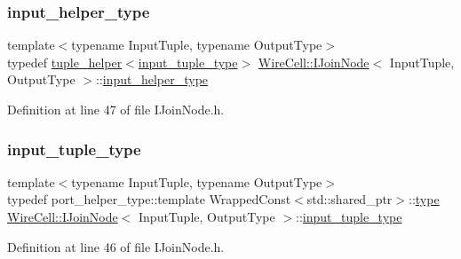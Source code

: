 \subsubsection{\texorpdfstring{input\+\_\+helper\+\_\+type}{input\_helper\_type}}
{\footnotesize\ttfamily template$<$typename Input\+Tuple, typename Output\+Type$>$ \\
typedef \hyperlink{struct_wire_cell_1_1tuple__helper}{tuple\+\_\+helper}$<$\hyperlink{class_wire_cell_1_1_i_join_node_ae9ca74a75f29555ad20944d585f3b232}{input\+\_\+tuple\+\_\+type}$>$ \hyperlink{class_wire_cell_1_1_i_join_node}{Wire\+Cell\+::\+I\+Join\+Node}$<$ Input\+Tuple, Output\+Type $>$\+::\hyperlink{class_wire_cell_1_1_i_join_node_ab2bee25205e04b7620344e5fccd27180}{input\+\_\+helper\+\_\+type}}



Definition at line 47 of file I\+Join\+Node.\+h.

\mbox{\label{class_wire_cell_1_1_i_join_node_ae9ca74a75f29555ad20944d585f3b232}} 
\subsubsection{\texorpdfstring{input\+\_\+tuple\+\_\+type}{input\_tuple\_type}}
{\footnotesize\ttfamily template$<$typename Input\+Tuple, typename Output\+Type$>$ \\
typedef port\+\_\+helper\+\_\+type\+::template Wrapped\+Const$<$std\+::shared\+\_\+ptr$>$\+::\hyperlink{namespace_wire_cell_a1f69a2598e2cdb413ffac1157b50670a}{type} \hyperlink{class_wire_cell_1_1_i_join_node}{Wire\+Cell\+::\+I\+Join\+Node}$<$ Input\+Tuple, Output\+Type $>$\+::\hyperlink{class_wire_cell_1_1_i_join_node_ae9ca74a75f29555ad20944d585f3b232}{input\+\_\+tuple\+\_\+type}}



Definition at line 46 of file I\+Join\+Node.\+h.

\mbox{\label{class_wire_cell_1_1_i_join_node_a7af33cc87415e15f0e7db2b083f3def7}} 
